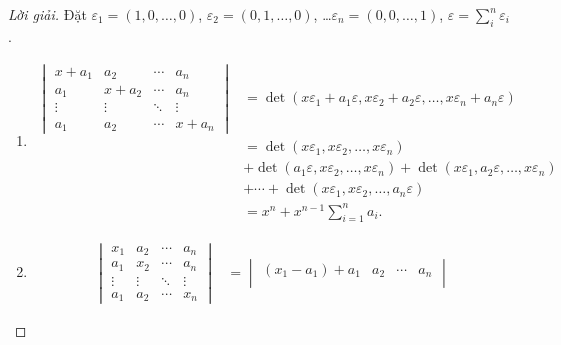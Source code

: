 \documentclass[class=linearalgebra,crop=false]{standalone}
\begin{document}
\begin{proof}[Lời giải]
    \par Đặt $\varepsilon_{1} = (1, 0, \ldots, 0)$, $\varepsilon_{2} = (0, 1, \ldots, 0)$, \ldots $\varepsilon_{n} = (0, 0, \ldots, 1)$, $\varepsilon = \displaystyle\sum^{n}_{i}\varepsilon_{i}$.
    \begin{enumerate}[label = (\alph*)]
        \item
            \begin{align*}
                \begin{vmatrix}
                    x + a_{1} & a_{2}     & \cdots & a_{n}     \\
                    a_{1}     & x + a_{2} & \cdots & a_{n}     \\
                    \vdots    & \vdots    & \ddots & \vdots    \\
                    a_{1}     & a_{2}     & \cdots & x + a_{n}
                \end{vmatrix}
                & = \det(x\varepsilon_{1} + a_{1}\varepsilon, x\varepsilon_{2} + a_{2}\varepsilon, \ldots, x\varepsilon_{n} + a_{n}\varepsilon) \\
                & = \det(x\varepsilon_{1}, x\varepsilon_{2}, \ldots, x\varepsilon_{n}) \\
                & + \det(a_{1}\varepsilon, x\varepsilon_{2}, \ldots, x\varepsilon_{n}) + \det(x\varepsilon_{1}, a_{2}\varepsilon, \ldots, x\varepsilon_{n}) \\
                & + \cdots + \det(x\varepsilon_{1}, x\varepsilon_{2}, \ldots, a_{n}\varepsilon) \\
                & = x^{n} + x^{n-1}\sum^{n}_{i=1}a_{i}.
            \end{align*}
        \item
            \begin{align*}
                \begin{vmatrix}
                    x_{1}  & a_{2}  & \cdots & a_{n}   \\
                    a_{1}  & x_{2}  & \cdots & a_{n}   \\
                    \vdots & \vdots & \ddots & \vdots  \\
                    a_{1}  & a_{2}  & \cdots & x_{n}
                \end{vmatrix}
                & =
                \begin{vmatrix}
                    (x_{1} - a_{1}) + a_{1}  & a_{2}                    & \cdots & a_{n}                   \\

\end{vmatrix}
\end{align*}
\end{enumerate}
\end{proof}
\end{document}
